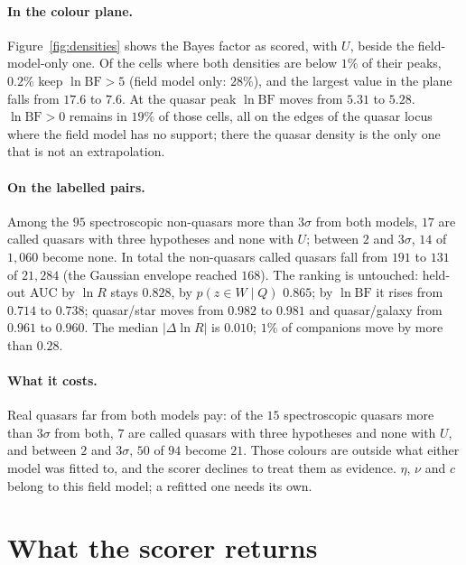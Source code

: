\documentclass[11pt,a4paper]{article}
\begin{document}
\paragraph{In the colour plane.} Figure~\ref{fig:densities} shows the Bayes
factor as scored, with $U$, beside the field-model-only one. Of the cells where
both densities are below $1\%$ of their peaks, $0.2\%$ keep $\ln\mathrm{BF}>5$
(field model only: $28\%$), and the largest value in the plane falls from $17.6$
to $7.6$. At the quasar peak $\ln\mathrm{BF}$ moves from $5.31$ to $5.28$.
$\ln\mathrm{BF}>0$ remains in $19\%$ of those cells, all on the edges of the
quasar locus where the field model has no support; there the quasar density is
the only one that is not an extrapolation.

\paragraph{On the labelled pairs.} Among the $95$ spectroscopic non-quasars more
than $3\sigma$ from both models, $17$ are called quasars with three hypotheses
and none with $U$; between $2$ and $3\sigma$, $14$ of $1{,}060$ become none. In
total the non-quasars called quasars fall from $191$ to $131$ of $21{,}284$ (the
Gaussian envelope reached $168$). The ranking is untouched: held-out AUC by
$\ln R$ stays $0.828$, by $p(z\in W\mid Q)$ $0.865$; by $\ln\mathrm{BF}$ it rises
from $0.714$ to $0.738$; quasar/star moves from $0.982$ to $0.981$ and
quasar/galaxy from $0.961$ to $0.960$. The median $|\Delta\ln R|$ is $0.010$;
$1\%$ of companions move by more than $0.28$.

\paragraph{What it costs.} Real quasars far from both models pay: of the $15$
spectroscopic quasars more than $3\sigma$ from both, $7$ are called quasars with
three hypotheses and none with $U$, and between $2$ and $3\sigma$, $50$ of $94$
become $21$. Those colours are outside what either model was fitted to, and the
scorer declines to treat them as evidence. $\eta$, $\nu$ and $c$ belong to this
field model; a refitted one needs its own.

\section{What the scorer returns}
\label{sec:outputs}
\end{document}

